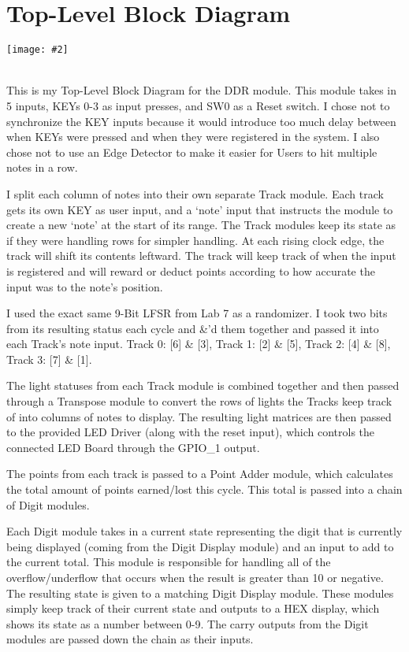 \documentclass{article}
\newenvironment{solution}{\begin{mdframed}[style=SolutionFrame]}{\end{mdframed}}
\newcommand{\img}[2][1.0]{
    \begin{minipage}[t]{\linewidth}
        \begin{center}
            \texttt{[image: \#2]}
        \end{center}
    \end{minipage}
}
\begin{document}
\section{Top-Level Block Diagram}
    \begin{solution}
        \img{block_diagram.png} \\

        \newpage
        This is my Top-Level Block Diagram for the DDR module. This module takes in 5 inputs, KEYs 0-3 as input presses, and SW0 as a Reset switch. I chose not to synchronize the KEY inputs because it would introduce too much delay between when KEYs were pressed and when they were registered in the system. I also chose not to use an Edge Detector to make it easier for Users to hit multiple notes in a row.

        I split each column of notes into their own separate Track module. Each track gets its own KEY as user input, and a `note' input that instructs the module to create a new `note' at the start of its range. The Track modules keep its state as if they were handling rows for simpler handling. At each rising clock edge, the track will shift its contents leftward. The track will keep track of when the input is registered and will reward or deduct points according to how accurate the input was to the note's position.

        I used the exact same 9-Bit LFSR from Lab 7 as a randomizer. I took two bits from its resulting status each cycle and \&'d them together and passed it into each Track's note input. Track 0: [6] \& [3], Track 1: [2] \& [5], Track 2: [4] \& [8], Track 3: [7] \& [1].

        The light statuses from each Track module is combined together and then passed through a Transpose module to convert the rows of lights the Tracks keep track of into columns of notes to display. The resulting light matrices are then passed to the provided LED Driver (along with the reset input), which controls the connected LED Board through the GPIO\_1 output.

        The points from each track is passed to a Point Adder module, which calculates the total amount of points earned/lost this cycle. This total is passed into a chain of Digit modules.
        
        Each Digit module takes in a current state representing the digit that is currently being displayed (coming from the Digit Display module) and an input to add to the current total. This module is responsible for handling all of the overflow/underflow that occurs when the result is greater than 10 or negative. The resulting state is given to a matching Digit Display module. These modules simply keep track of their current state and outputs to a HEX display, which shows its state as a number between 0-9. The carry outputs from the Digit modules are passed down the chain as their inputs.
    \end{solution}
\end{document}

